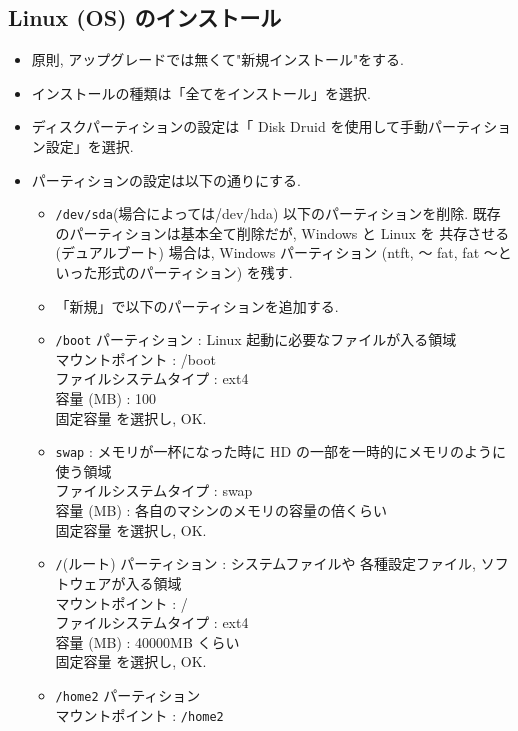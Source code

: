 \documentclass{jarticle}
\begin{document}
\subsection{Linux (OS) のインストール}
	\begin{itemize} 
	\item 原則, アップグレードでは無くて"新規インストール"をする.
	\item インストールの種類は「全てをインストール」を選択.
	\item ディスクパーティションの設定は「 Disk Druid を使用して手動パーティション設定」を選択.
	\item パーティションの設定は以下の通りにする.
		\begin{itemize}
			\item \verb|/dev/sda|(場合によっては/dev/hda) 以下のパーティションを削除.
			      既存のパーティションは基本全て削除だが, Windows と Linux を
			      共存させる (デュアルブート) 場合は, Windows パーティション
			      (ntft, 〜 fat, fat 〜といった形式のパーティション) を残す.
			\item 「新規」で以下のパーティションを追加する.
			\item \verb|/boot| パーティション : Linux 起動に必要なファイルが入る領域 \\
			      マウントポイント : /boot \\
			      ファイルシステムタイプ : ext4 \\
			      容量 (MB) : 100 \\
			      固定容量 を選択し, OK.
			\item \verb|swap| : メモリが一杯になった時に
			      HD の一部を一時的にメモリのように使う領域 \\
			      ファイルシステムタイプ : swap \\
			      容量 (MB) : 各自のマシンのメモリの容量の倍くらい \\
			      固定容量 を選択し, OK.
			\item \verb|/|(ルート) パーティション : システムファイルや
			      各種設定ファイル, ソフトウェアが入る領域 \\
			      マウントポイント : / \\
			      ファイルシステムタイプ : ext4 \\
			      容量 (MB) : 40000MB くらい \\
			      固定容量 を選択し, OK. \\
			\item \verb|/home2| パーティション \\
			      マウントポイント : \verb|/home2| \\

\end{itemize}
\end{itemize}
\end{document}
